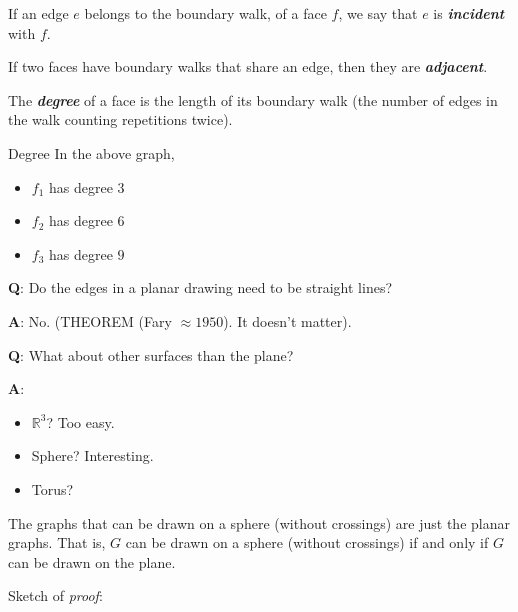 \begin{Definition}{}{}
    If an edge $ e $ belongs to the boundary walk, of a face $ f $,
    we say that $ e $ is \textbf{\emph{incident}} with $ f $.
\end{Definition}



\begin{Definition}{}{}
    If two faces have boundary walks that share an edge,
    then they are \textbf{\emph{adjacent}}.
\end{Definition}



\begin{Definition}{}{}
    The \textbf{\emph{degree}} of a face is the length of its
    boundary walk (the number of edges in the walk counting repetitions
    twice).
\end{Definition}



\begin{Example}{Degree}{}
    In the above graph,
    \begin{itemize}
        \item $ f_1 $ has degree $ 3 $
        \item $ f_2 $ has degree $ 6 $
        \item $ f_3 $ has degree $ 9 $
    \end{itemize}
\end{Example}


\textbf{Q}: Do the edges in a planar drawing need to be straight
lines?

\textbf{A}: No. (THEOREM (Fary $ \approx 1950 $). It doesn't matter).

\textbf{Q}: What about other surfaces than the plane?

\textbf{A}:
\begin{itemize}
    \item $ \mathbb{R}^3 $? Too easy.
    \item Sphere? Interesting.
    \item Torus?
\end{itemize}


\begin{Proposition}{}{}
    The graphs that can be drawn on a sphere (without crossings)
    are just the planar graphs. That is, $ G $ can be drawn
    on a sphere (without crossings)
    if and only if $ G $ can be drawn on the plane.
\end{Proposition}


Sketch of \emph{proof}:

